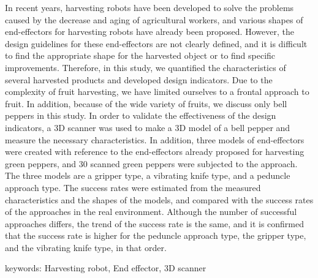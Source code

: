 In recent years, harvesting robots have been developed to solve the problems caused by the decrease and aging of agricultural workers, and various shapes of end-effectors for harvesting robots have already been proposed.
However, the design guidelines for these end-effectors are not clearly defined, and it is difficult to find the appropriate shape for the harvested object or to find specific improvements.
Therefore, in this study, we quantified the characteristics of several harvested products and developed design indicators.
Due to the complexity of fruit harvesting, we have limited ourselves to a frontal approach to fruit.
In addition, because of the wide variety of fruits, we discuss only bell peppers in this study.
In order to validate the effectiveness of the design indicators, a 3D scanner was used to make a 3D model of a bell pepper and measure the necessary characteristics.
In addition, three models of end-effectors were created with reference to the end-effectors already proposed for harvesting green peppers, and 30 scanned green peppers were subjected to the approach.
The three models are a gripper type, a vibrating knife type, and a peduncle approach type.
The success rates were estimated from the measured characteristics and the shapes of the models, and compared with the success rates of the approaches in the real environment. 
Although the number of successful approaches differs, the trend of the success rate is the same, and it is confirmed that the success rate is higher for the peduncle approach type, the gripper type, and the vibrating knife type, in that order.

keywords: Harvesting robot, End effector, 3D scanner
